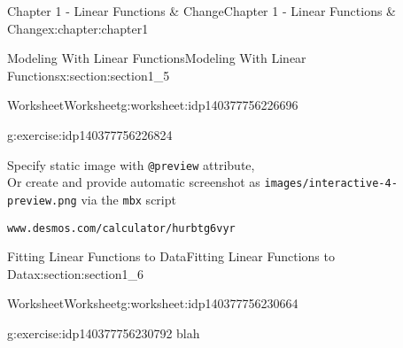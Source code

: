 \documentclass[oneside,10pt,]{book}
\newcommand{\mono}[1]{\texttt{#1}}
\newlength{\qrsize}
\newlength{\previewwidth}
\begin{document}
\begin{chapterptx}{Chapter 1 - Linear Functions \& Change}{}{Chapter 1 - Linear Functions \& Change}{}{}{x:chapter:chapter1}
\begin{sectionptx}{Modeling With Linear Functions}{}{Modeling With Linear Functions}{}{}{x:section:section1_5}
\begin{worksheet-subsection}{Worksheet}{}{Worksheet}{}{}{g:worksheet:idp140377756226696}
\begin{divisionexercise}{1}{}{}{g:exercise:idp140377756226824}
\begin{enumerate}[label=(\alph*)]
\begin{tcbraster}[raster columns=2, raster column skip=1pt, raster halign=center, raster force size=false, raster left skip=0pt, raster right skip=0pt]
\begin{tcolorbox}[previewstyle, width=\previewwidth]
{\small{}Specify static image with \mono{@preview} attribute,\\Or create and provide automatic screenshot as \mono{images/interactive-4-preview.png} via the \mono{mbx} script}%
\end{tcolorbox}%
\begin{tcolorbox}[qrstyle]%
{\hypersetup{urlcolor=black}}%
\end{tcolorbox}%
\begin{tcolorbox}[captionstyle]%
\small \mono{www.desmos.com/calculator/hurbtg6vyr}\end{tcolorbox}%
\end{tcbraster}%
%
\end{enumerate}
\end{divisionexercise}%
\end{worksheet-subsection}
\restoregeometry
\end{sectionptx}
%
%
\typeout{************************************************}
\typeout{************************************************}
%
\begin{sectionptx}{Fitting Linear Functions to Data}{}{Fitting Linear Functions to Data}{}{}{x:section:section1_6}
%
%
\typeout{************************************************}
\typeout{************************************************}
%
\begin{worksheet-subsection}{Worksheet}{}{Worksheet}{}{}{g:worksheet:idp140377756230664}
\begin{divisionexercise}{1}{}{}{g:exercise:idp140377756230792}%
blah\end{divisionexercise}%
\end{worksheet-subsection}
\restoregeometry
\end{sectionptx}
\end{chapterptx}
\end{document}
